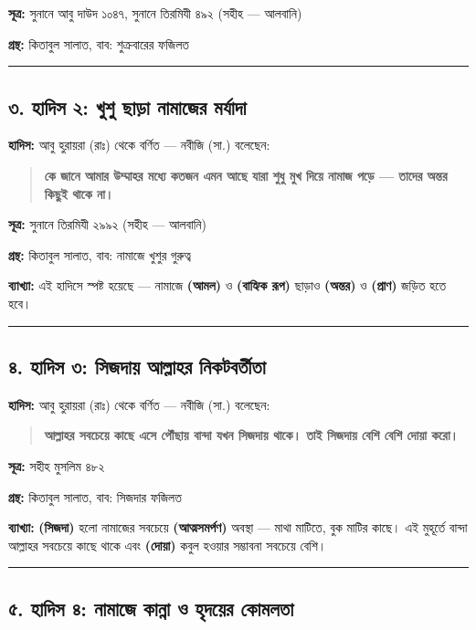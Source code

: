 \textbf{সূত্র:} সুনানে আবু দাউদ ১০৪৭, সুনানে তিরমিযী ৪৯২ (সহীহ — আলবানি)

\textbf{গ্রন্থ:} কিতাবুল সালাত, বাব: শুক্রবারের ফজিলত

\medskip\hrule\medskip

\subsection*{৩. হাদিস ২: খুশু ছাড়া নামাজের মর্যাদা}

\textbf{হাদিস:} আবু হুরায়রা (রাঃ) থেকে বর্ণিত — নবীজি (সা.) বলেছেন:

\begin{quote}
\textbf{কে জানে আমার উম্মাহর মধ্যে কতজন এমন আছে যারা শুধু মুখ দিয়ে নামাজ পড়ে — তাদের অন্তর কিছুই থাকে না।}
\end{quote}

\textbf{সূত্র:} সুনানে তিরমিযী ২৯৯২ (সহীহ — আলবানি)

\textbf{গ্রন্থ:} কিতাবুল সালাত, বাব: নামাজে খুশুর গুরুত্ব

\textbf{ব্যাখ্যা:} এই হাদিসে স্পষ্ট হয়েছে — নামাজে \textbf{ (আমল)} ও \textbf{  (বাহ্যিক রূপ)} ছাড়াও \textbf{ (অন্তর)} ও \textbf{ (প্রাণ)} জড়িত হতে হবে।

\medskip\hrule\medskip

\subsection*{৪. হাদিস ৩: সিজদায় আল্লাহর নিকটবর্তীতা}

\textbf{হাদিস:} আবু হুরায়রা (রাঃ) থেকে বর্ণিত — নবীজি (সা.) বলেছেন:

\begin{quote}
\textbf{আল্লাহর সবচেয়ে কাছে এসে পৌঁছায় বান্দা যখন সিজদায় থাকে। তাই সিজদায় বেশি বেশি দোয়া করো।}
\end{quote}

\textbf{সূত্র:} সহীহ মুসলিম ৪৮২

\textbf{গ্রন্থ:} কিতাবুল সালাত, বাব: সিজদার ফজিলত

\textbf{ব্যাখ্যা:} \textbf{ (সিজদা)} হলো নামাজের সবচেয়ে \textbf{ (আত্মসমর্পণ)} অবস্থা — মাথা মাটিতে, বুক মাটির কাছে। এই মুহূর্তে বান্দা আল্লাহর সবচেয়ে কাছে থাকে এবং \textbf{ (দোয়া)} কবুল হওয়ার সম্ভাবনা সবচেয়ে বেশি।

\medskip\hrule\medskip

\subsection*{৫. হাদিস ৪: নামাজে কান্না ও হৃদয়ের কোমলতা}

